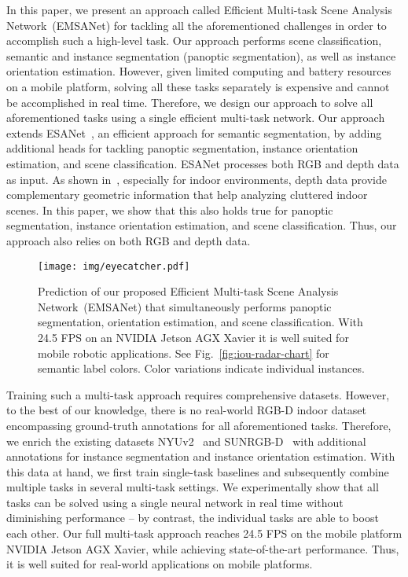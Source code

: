 \documentclass[conference]{IEEEtran}
\begin{document}
In this paper, we present an approach called Efficient Multi-task Scene Analysis Network~(EMSANet) for tackling all the aforementioned challenges in order to accomplish such a high-level task.
Our approach performs scene classification, semantic and instance segmentation (panoptic segmentation), as well as instance orientation estimation.
However, given limited computing and battery resources on a mobile platform, solving all these tasks separately is expensive and cannot be accomplished in real time.
Therefore, we design our approach to solve all aforementioned tasks using a single efficient multi-task network.
Our approach extends ESANet~\cite{esanet2021icra}, an efficient approach for semantic segmentation, by adding additional heads for tackling panoptic segmentation, instance orientation estimation, and scene classification.
ESANet processes both RGB and depth data as input. 
As shown in~\cite{esanet2021icra}, especially for indoor environments, depth data provide complementary geometric information that help analyzing cluttered indoor scenes.
In this paper, we show that this also holds true for panoptic segmentation, instance orientation estimation, and scene classification.
Thus, our approach also relies on both RGB and depth data.
\begin{figure}[!t]
    \vspace{0.5mm}
	\centering
	\texttt{[image: img/eyecatcher.pdf]}
	\vspace{-9mm}
	\caption{Prediction of our proposed Efficient Multi-task Scene Analysis Network~(EMSANet) that simultaneously performs panoptic segmentation, orientation estimation, and scene classification. With 24.5 FPS on an NVIDIA Jetson AGX Xavier it is well suited for mobile robotic applications. See Fig.~\ref{fig:iou-radar-chart} for semantic label colors. Color variations indicate individual instances.
	}
	\label{fig:eyecatcher}
	\vspace{-4mm}
\end{figure}

Training such a multi-task approach requires comprehensive datasets.
However, to the best of our knowledge, there is no real-world RGB-D indoor dataset encompassing ground-truth annotations for all aforementioned tasks.
Therefore, we enrich the existing datasets NYUv2~\cite{NYUv2-eccv2012} and SUNRGB-D~\cite{SUNRGBD-cvpr2015} with additional annotations for instance segmentation and instance orientation estimation.
With this data at hand, we first train single-task baselines and subsequently combine multiple tasks in several multi-task settings.
We experimentally show that all tasks can be solved using a single neural network in real time without diminishing performance -- by contrast, the individual tasks are able to boost each other.
Our full multi-task approach reaches 24.5 FPS on the mobile platform NVIDIA Jetson AGX Xavier, while achieving state-of-the-art performance. 
Thus, it is well suited for real-world applications on mobile platforms.
\end{document}
